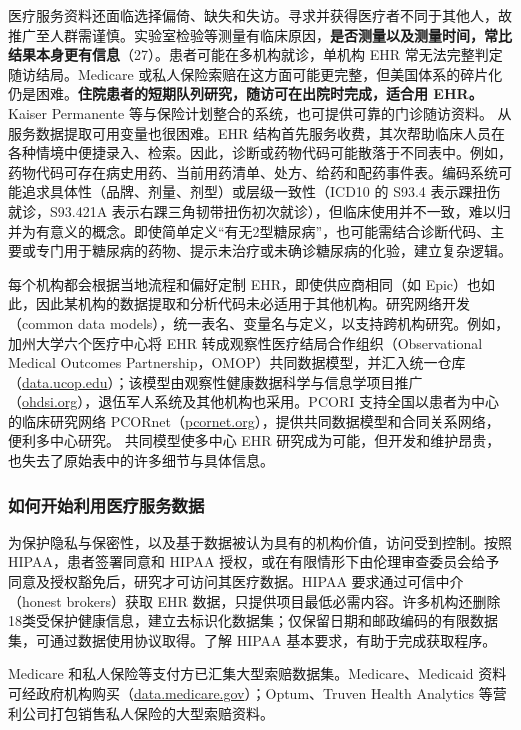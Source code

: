 医疗服务资料还面临选择偏倚、缺失和失访。寻求并获得医疗者不同于其他人，故推广至人群需谨慎。实验室检验等测量有临床原因，\textbf{是否测量以及测量时间，常比结果本身更有信息}（27）。患者可能在多机构就诊，单机构 EHR 常无法完整判定随访结局。Medicare 或私人保险索赔在这方面可能更完整，但美国体系的碎片化仍是困难。\textbf{住院患者的短期队列研究，随访可在出院时完成，适合用 EHR。}Kaiser Permanente 等与保险计划整合的系统，也可提供可靠的门诊随访资料。
从服务数据提取可用变量也很困难。EHR 结构首先服务收费，其次帮助临床人员在各种情境中便捷录入、检索。因此，诊断或药物代码可能散落于不同表中。例如，药物代码可存在病史用药、当前用药清单、处方、给药和配药事件表。编码系统可能追求具体性（品牌、剂量、剂型）或层级一致性（ICD10 的 S93.4 表示踝扭伤就诊，S93.421A 表示右踝三角韧带扭伤初次就诊），但临床使用并不一致，难以归并为有意义的概念。即使简单定义“有无2型糖尿病”，也可能需结合诊断代码、主要或专门用于糖尿病的药物、提示未治疗或未确诊糖尿病的化验，建立复杂逻辑。

每个机构都会根据当地流程和偏好定制 EHR，即使供应商相同（如 Epic）也如此，因此某机构的数据提取和分析代码未必适用于其他机构。研究网络开发（common data models），统一表名、变量名与定义，以支持跨机构研究。例如，加州大学六个医疗中心将 EHR 转成观察性医疗结局合作组织（Observational Medical Outcomes Partnership，OMOP）共同数据模型，并汇入统一仓库（\url{data.ucop.edu}）；该模型由观察性健康数据科学与信息学项目推广（\url{ohdsi.org}），退伍军人系统及其他机构也采用。PCORI 支持全国以患者为中心的临床研究网络 PCORnet（\url{pcornet.org}），提供共同数据模型和合同关系网络，便利多中心研究。
共同模型使多中心 EHR 研究成为可能，但开发和维护昂贵，也失去了原始表中的许多细节与具体信息。

\subsubsection{如何开始利用医疗服务数据}
为保护隐私与保密性，以及基于数据被认为具有的机构价值，访问受到控制。按照 HIPAA，患者签署同意和 HIPAA 授权，或在有限情形下由伦理审查委员会给予同意及授权豁免后，研究才可访问其医疗数据。HIPAA 要求通过可信中介（honest brokers）获取 EHR 数据，只提供项目最低必需内容。许多机构还删除18类受保护健康信息，建立去标识化数据集；仅保留日期和邮政编码的有限数据集，可通过数据使用协议取得。了解 HIPAA 基本要求，有助于完成获取程序。

Medicare 和私人保险等支付方已汇集大型索赔数据集。Medicare、Medicaid 资料可经政府机构购买（\url{data.medicare.gov}）；Optum、Truven Health Analytics 等营利公司打包销售私人保险的大型索赔资料。

